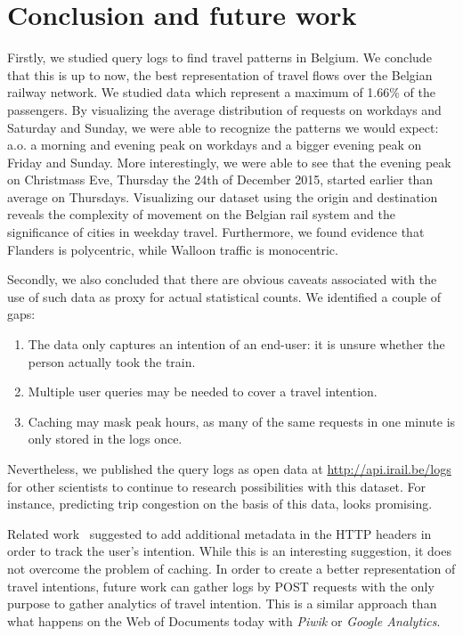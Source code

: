 \documentclass{sig-alternate}
\begin{document}
\section{Conclusion and future work}
\label{sec:conclusion}

Firstly, we studied query logs to find travel patterns in Belgium.
We conclude that this is up to now, the best representation of travel flows over the Belgian railway network.%
We studied data which represent a maximum of 1.66\% of the passengers.
By visualizing the average distribution of requests on workdays and Saturday and Sunday, we were able to recognize the patterns we would expect: a.o. a morning and evening peak on workdays and a bigger evening peak on Friday and Sunday.
More interestingly, we were able to see that the evening peak on Christmass Eve, Thursday the 24th of December 2015, started earlier than average on Thursdays.
Visualizing our dataset using the origin and destination reveals the complexity of movement on the Belgian rail system and the significance of cities in weekday travel.
Furthermore, we found evidence that Flanders is polycentric, while Walloon traffic is monocentric.

Secondly, we also concluded that there are obvious caveats associated with the use of such data as proxy for actual statistical counts. 
We identified a couple of gaps:
\begin{enumerate}
  \item The data only captures an intention of an end-user: it is unsure whether the person actually took the train.
  \item Multiple user queries may be needed to cover a travel intention.
  \item Caching may mask peak hours, as many of the same requests in one minute is only stored in the logs once.
\end{enumerate}
Nevertheless, we published the query logs as open data at \url{http://api.irail.be/logs} for other scientists to continue to research possibilities with this dataset.
For instance, predicting trip congestion on the basis of this data, looks promising. %

Related work~\cite{verborgh2014lonesome} suggested to add additional metadata in the HTTP headers in order to track the user's intention.
While this is an interesting suggestion, it does not overcome the problem of caching.
In order to create a better representation of travel intentions, future work can gather logs by POST requests with the only purpose to gather analytics of travel intention.
This is a similar approach than what happens on the Web of Documents today with \emph{Piwik} or \emph{Google Analytics}.

\let\oldsection\section
\renewcommand{\section}[2][1]{\oldsection{#1}\vspace{-3pt}}



\end{document}
